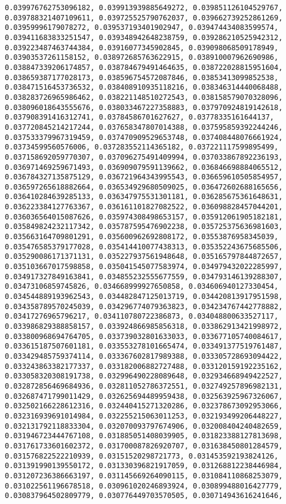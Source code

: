 \documentclass[11pt]{article}
\begin{document}
\begin{Verbatim}[commandchars=\\\{\}]
0.039976762753096182, 0.039913939885649272, 0.039851126104529767, 0.039788321407109611, 0.039725525790762037, 0.039662739252861269, 0.03959996179078272, 0.039537193401902947, 0.039474434083599574, 0.039411683833251547, 0.039348942648238759, 0.039286210525942312, 0.039223487463744384, 0.03916077345902845, 0.039098068509178949, 0.03903537261158152, 0.038972685763622915, 0.038910007962690986, 0.038847339206174857, 0.038784679491464635, 0.038722028815951604, 0.038659387177028173, 0.038596754572087846, 0.03853413099852538, 0.038471516453736532, 0.038408910935118216, 0.038346314440068488, 0.038283726965986462, 0.038221148510272543, 0.038158579070328096, 0.038096018643555676, 0.038033467227358883, 0.037970924819142618, 0.037908391416312741, 0.03784586701627627, 0.03778335161644137, 0.037720845214217244, 0.037658347807014388, 0.037595859392244246, 0.037533379967319459, 0.037470909529653748, 0.037408448076661924, 0.03734599560576006, 0.037283552114365182, 0.037221117599895499, 0.037158692059770307, 0.037096275491409994, 0.037033867892236193, 0.036971469259671493, 0.036909079591139662, 0.036846698884065512, 0.036784327135875129, 0.036721964343995543, 0.036659610505854957, 0.036597265618882664, 0.036534929680509025, 0.036472602688165656, 0.036410284639285133, 0.036347975531301181, 0.036285675361648631, 0.036223384127763367, 0.036161101827082522, 0.036098828457044201, 0.036036564015087626, 0.035974308498653157, 0.035912061905182181, 0.035849824232117342, 0.035787595476902238, 0.035725375636981603, 0.035663164709801291, 0.035600962692808172, 0.03553876958345039, 0.035476585379177028, 0.035414410077438313, 0.035352243675685506, 0.035290086171371131, 0.035227937561948648, 0.035165797844872657, 0.035103667017598858, 0.035041545077583974, 0.034979432022285997, 0.034917327849163841, 0.034855232555677559, 0.034793146139288307, 0.03473106859745826, 0.034668999927650858, 0.034606940127330454, 0.034544889193962543, 0.034482847125013719, 0.034420813917951598, 0.034358789570245039, 0.034296774079363823, 0.034234767442778882, 0.03417276965796217, 0.034110780722386873, 0.034048800633527117, 0.033986829388858157, 0.033924866985856318, 0.033862913421998972, 0.033800968694764705, 0.033739032801633033, 0.033677105740084617, 0.033615187507601181, 0.033553278101665474, 0.033491377519761487, 0.033429485759374114, 0.033367602817989388, 0.033305728693094422, 0.033243863382177337, 0.033182006882727488, 0.033120159192235162, 0.033058320308191738, 0.032996490228089648, 0.032934668949422527, 0.032872856469684936, 0.032811052786372551, 0.032749257896982131, 0.032687471799011429, 0.032625694489959438, 0.032563925967326067, 0.032502166228612316, 0.032440415271320286, 0.032378673092953066, 0.032316939691014984, 0.032255215063011253, 0.032193499206448227, 0.032131792118833304, 0.032070093797674906, 0.032008404240482659, 0.031946723444767108, 0.031885051408039905, 0.031823388127813698, 0.031761733601602372, 0.031700087826920707, 0.031638450801284579, 0.031576822522210939, 0.03151520298721773, 0.031453592193824126, 0.031391990139550172, 0.031330396821917059, 0.031268812238446984, 0.031207236386663197, 0.031145669264090115, 0.031084110868253079, 0.031022561196678518, 0.030961020246893924, 0.030899488016427779, 0.030837964502809779, 0.030776449703570505, 0.030714943616241646, 
\end{Verbatim}
\end{document}
